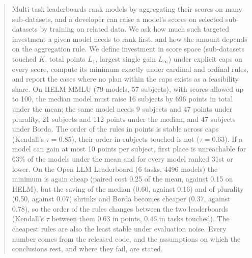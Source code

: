 \begin{abstract}
Multi-task leaderboards rank models by aggregating their scores on many sub-datasets, and a developer can raise a model's scores on selected sub-datasets by training on related data. We ask how much such targeted investment a given model needs to rank first, and how the amount depends on the aggregation rule. We define investment in score space (sub-datasets touched $K$, total points $L_1$, largest single gain $L_\infty$) under explicit caps on every score, compute its minimum exactly under cardinal and ordinal rules, and report the cases where no plan within the caps exists as a feasibility share. On HELM MMLU (79 models, 57 subjects), with scores allowed up to 100, the median model must raise 16 subjects by 696 points in total under the mean; the same model needs 9 subjects and 47 points under plurality, 21 subjects and 112 points under the median, and 47 subjects under Borda. The order of the rules in points is stable across caps (Kendall's $\tau=0.85$), their order in subjects touched is not ($\tau=0.63$). If a model can gain at most 10 points per subject, first place is unreachable for 63\% of the models under the mean and for every model ranked 31st or lower. On the Open LLM Leaderboard (6 tasks, 4496 models) the minimum is again cheap (paired cost 0.25 of the mean, against 0.15 on HELM), but the saving of the median (0.60, against 0.16) and of plurality (0.50, against 0.07) shrinks and Borda becomes cheaper (0.37, against 0.78), so the order of the rules changes between the two leaderboards (Kendall's $\tau$ between them 0.63 in points, 0.46 in tasks touched). The cheapest rules are also the least stable under evaluation noise. Every number comes from the released code, and the assumptions on which the conclusions rest, and where they fail, are stated.
\end{abstract}
